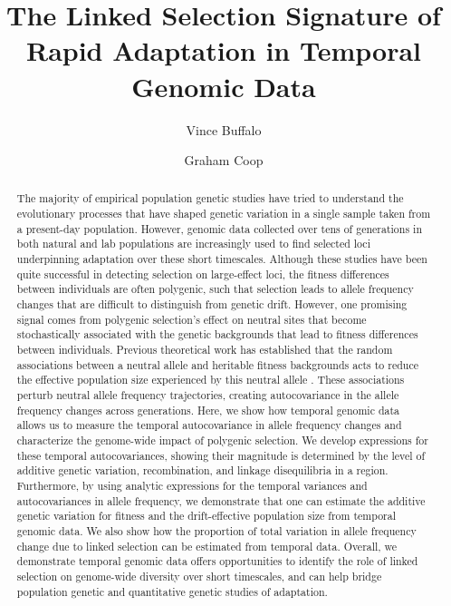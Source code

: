 \documentclass[11pt]{article}
\title{The Linked Selection Signature of Rapid Adaptation in Temporal Genomic Data}
\author[$\ast$,$\dag$,$1$]{Vince Buffalo}
\author[$\dag$]{Graham Coop}
\affil[$\ast$]{\footnotesize Population Biology Graduate Group}
\affil[$\dag$]{\footnotesize Center for Population Biology, Department of Evolution and Ecology, University of California, Davis, CA 95616}
\affil[$1$]{\footnotesize Email for correspondence: \href{mailto:vsbuffalo@ucdavis.edu}{vsbuffalo@ucdavis.edu}}
\begin{document}
\maketitle


\linenumbers
\begin{abstract}

  The majority of empirical population genetic studies have tried to understand
  the evolutionary processes that have shaped genetic variation in a single
  sample taken from a present-day population.  However, genomic data collected
  over tens of generations in both natural and lab populations are increasingly
  used to find selected loci underpinning adaptation over these short
  timescales. Although these studies have been quite successful in detecting
  selection on large-effect loci, the fitness differences between individuals
  are often polygenic, such that selection leads to allele frequency changes
  that are difficult to distinguish from genetic drift. However, one promising
  signal comes from polygenic selection's effect on neutral sites that become
  stochastically associated with the genetic backgrounds that lead to fitness
  differences between individuals.  Previous theoretical work has established
  that the random associations between a neutral allele and heritable fitness
  backgrounds acts to reduce the effective population size experienced by this
  neutral allele \parencite{Santiago1995-hx,Santiago1998-bs}. These
  associations perturb neutral allele frequency trajectories, creating
  autocovariance in the allele frequency changes across generations. Here, we
  show how temporal genomic data allows us to measure the temporal
  autocovariance in allele frequency changes and characterize the genome-wide
  impact of polygenic selection. We develop expressions for these temporal
  autocovariances, showing their magnitude is determined by the level of
  additive genetic variation, recombination, and linkage disequilibria in a
  region. Furthermore, by using analytic expressions for the temporal variances
  and autocovariances in allele frequency, we demonstrate that one can estimate
  the additive genetic variation for fitness and the drift-effective population
  size from temporal genomic data. We also show how the proportion of total
  variation in allele frequency change due to linked selection can be estimated
  from temporal data. Overall, we demonstrate temporal genomic data offers
  opportunities to identify the role of linked selection on genome-wide
  diversity over short timescales, and can help bridge population genetic and
  quantitative genetic studies of adaptation.

 \end{abstract}
\end{document}
